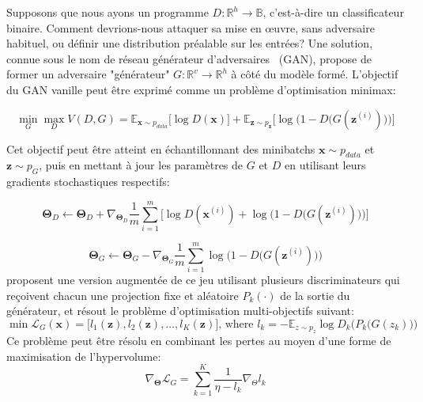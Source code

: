 Supposons que nous ayons un programme $D: \mathbb{R}^h\rightarrow\mathbb{B}$, c'est-à-dire un classificateur binaire. Comment devrions-nous attaquer sa mise en œuvre, sans adversaire habituel, ou définir une distribution préalable sur les entrées? Une solution, connue sous le nom de réseau générateur d'adversaires~\citep{goodfellow2014gan} (GAN), propose de former un adversaire "générateur" $G: \mathbb{R}^v\rightarrow\mathbb{R}^h$ à côté du modèle formé. L'objectif du GAN vanille peut être exprimé comme un problème d'optimisation minimax:

\begin{equation}
\min_G \max_D V(D, G) = \mathbb{E}_{\mathbf x \sim p_{data}}\big[\log D(\mathbf x)\big] + \mathbb{E}_{\mathbf z \sim p_{\mathbf z}}\Big[\log\Big(1 - D\big(G(\mathbf z^{(i)})\big)\Big)\Big]
\end{equation}

Cet objectif peut être atteint en échantillonnant des minibatchs $\mathbf x \sim p_{data}$ et $\mathbf z \sim p_{G}$, puis en mettant à jour les paramètres de $G$ et $D$ en utilisant leurs gradients stochastiques respectifs:

\begin{equation}
\bm\Theta_D \leftarrow \bm\Theta_D + \nabla_{\bm\Theta_D}\frac{1}{m}\sum_{i=1}^m\Big[\log D(\mathbf x^{(i)}) + \log\Big(1 - D\big(G(\mathbf z^{(i)})\big)\Big)\Big]
\end{equation}

\begin{equation}
\bm\Theta_G \leftarrow \bm\Theta_G - \nabla_{\bm\Theta_G}\frac{1}{m}\sum_{i=1}^m \log\Big(1 - D\big(G(\mathbf z^{(i)})\big)\Big)
\end{equation}
%
\citet{albuquerque2019hgan} proposent une version augmentée de ce jeu utilisant plusieurs discriminateurs qui reçoivent chacun une projection fixe et aléatoire $P_k(\cdot)$ de la sortie du générateur, et résout le problème d'optimisation multi-objectifs suivant:
%
\begin{equation} \label{eq:moo_spec}
\min \mathbf{\mathcal{L}}_G(\mathbf x) = \big[l_1(\mathbf z), l_2(\mathbf z), \ldots, l_K(\mathbf z)\big] \text{, where } l_k = -\mathbb E_{z \sim p_z} \log D_k\Big(P_k\big(G(z_k)\big)\Big)
\end{equation}
%
Ce problème peut être résolu en combinant les pertes au moyen d'une forme de maximisation de l'hypervolume:
%
\begin{equation}
\nabla_{\bm\Theta} \mathcal{L}_G = \sum_{k=1}^K \frac{1}{\eta - l_k}\nabla_\Theta l_k
\end{equation}

